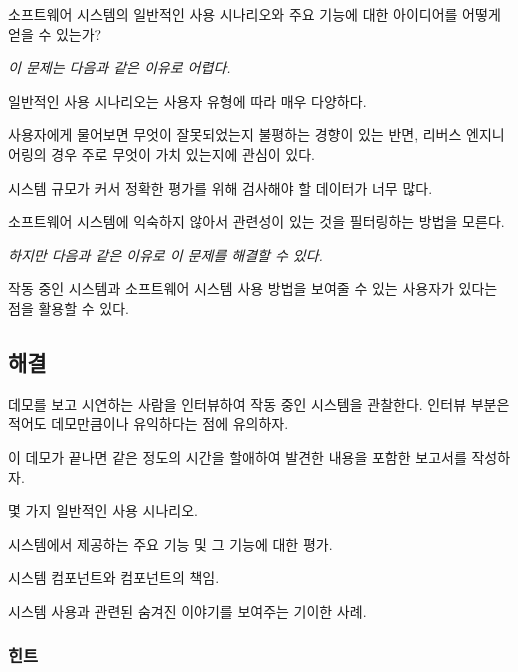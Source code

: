 \documentclass[a4paper,10pt,twoside]{book}
\begin{document}
소프트웨어 시스템의 일반적인 사용 시나리오와 주요 기능에 대한 아이디어를 어떻게 얻을 수 있는가?

\emph{이 문제는 다음과 같은 이유로 어렵다.}

\begin{bulletlist}
  \item 일반적인 사용 시나리오는 사용자 유형에 따라 매우 다양하다.

  \item 사용자에게 물어보면 무엇이 잘못되었는지 불평하는 경향이 있는 반면, 리버스 엔지니어링의 경우 주로 무엇이 가치 있는지에 관심이 있다.

  \item 시스템 규모가 커서 정확한 평가를 위해 검사해야 할 데이터가 너무 많다.

  \item 소프트웨어 시스템에 익숙하지 않아서 관련성이 있는 것을 필터링하는 방법을 모른다.

\emph{하지만 다음과 같은 이유로 이 문제를 해결할 수 있다.}

  \item 작동 중인 시스템과 소프트웨어 시스템 사용 방법을 보여줄 수 있는 사용자가 있다는 점을 활용할 수 있다.
\end{bulletlist}

\subsection*{해결}

데모를 보고 시연하는 사람을 인터뷰하여 작동 중인 시스템을 관찰한다. 인터뷰 부분은 적어도 데모만큼이나 유익하다는 점에 유의하자. 

이 데모가 끝나면 같은 정도의 시간을 할애하여 발견한 내용을 포함한 보고서를 작성하자.

\begin{bulletlist}
  \item 몇 가지 일반적인 사용 시나리오.

  \item 시스템에서 제공하는 주요 기능 및 그 기능에 대한 평가.

  \item 시스템 컴포넌트와 컴포넌트의 책임. 

  \item 시스템 사용과 관련된 숨겨진 이야기를 보여주는 기이한 사례.
\end{bulletlist}

\subsubsection*{힌트}
\end{document}

